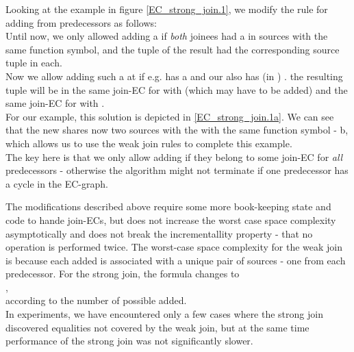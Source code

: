 Looking at the example in figure \ref{EC_strong_join.1}, we modify the rule for adding \GFAs{} from predecessors as follows:\\
Until now, we only allowed adding a \GFA{} if \emph{both} joinees had a \GFA{} in sources with the same function symbol, 
and the tuple of the result had the corresponding source tuple in each. \\
Now we allow adding such a \GFA{} at  if e.g.  has a \GFA{}  and our \GT{} also has \GFA{} (in ) . the resulting tuple will be in the same join-EC for  with  (which may have to be added) and the same join-EC for  with .\\
For our example, this solution is depicted in \ref{EC_strong_join.1a}. We can see that the new \GT{} shares now two sources with the \GFAs{} with the same function symbol - b, which allows us to use the weak join rules to complete this example.\\
The key here is that we only allow adding \GTs{} if they belong to some join-EC for \emph{all} predecessors - otherwise the algorithm might not terminate if one predecessor has a cycle in the EC-graph.

The modifications described above require some more book-keeping state and code to hande join-ECs, but does not increase the worst case space complexity asymptotically and does not break the incrementallity property - that no operation is performed twice. The worst-case space complexity for the weak join is  because each added \GFA{} is associated with a unique pair of sources - one from each predecessor. For the strong join, the formula changes to \\
,\\
 according to the number of possible \GFAs{} added.\\
In experiments, we have encountered only a few cases where the strong join discovered equalities not covered by the weak join, but at the same time performance of the strong join was not significantly slower.

